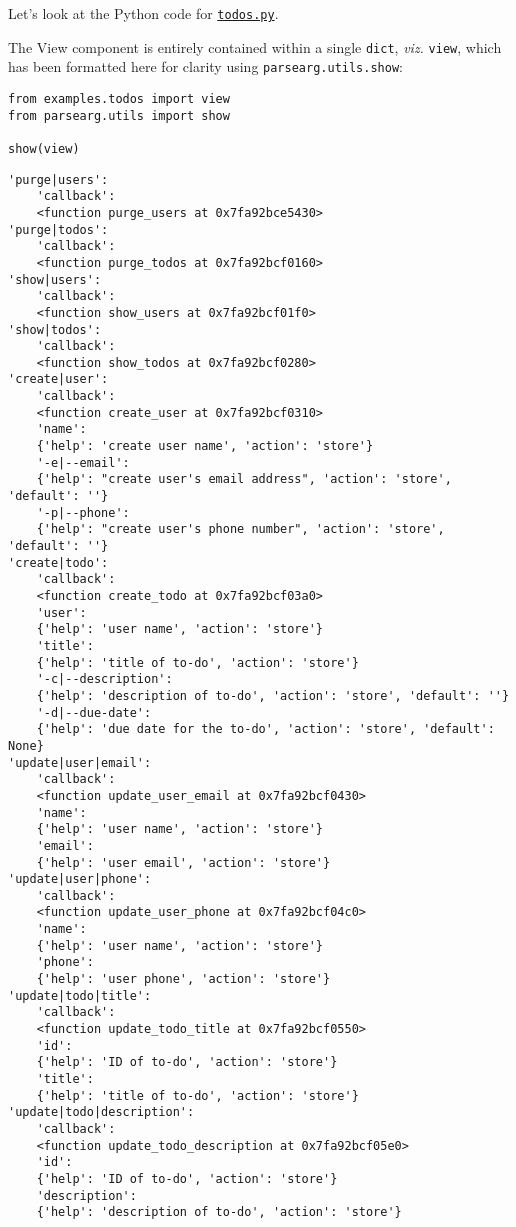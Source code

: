 \documentclass[10pt]{amsart}
\numberwithin{equation}{section}
\begin{document}
Let's look at the Python code 
for \href{https://raw.githubusercontent.com/tharte/parsearg/master/doc/examples/todos.py}{\texttt{todos.py}}.


The View component is entirely contained within a single \texttt{dict}, \emph{viz.} 
\texttt{view}, which has been formatted here for clarity using \texttt{parsearg.utils.show}:
\begin{verbatim}
from examples.todos import view
from parsearg.utils import show

show(view)
\end{verbatim}

\begin{verbatim}
'purge|users':
    'callback':
    <function purge_users at 0x7fa92bce5430>
'purge|todos':
    'callback':
    <function purge_todos at 0x7fa92bcf0160>
'show|users':
    'callback':
    <function show_users at 0x7fa92bcf01f0>
'show|todos':
    'callback':
    <function show_todos at 0x7fa92bcf0280>
'create|user':
    'callback':
    <function create_user at 0x7fa92bcf0310>
    'name':
    {'help': 'create user name', 'action': 'store'}
    '-e|--email':
    {'help': "create user's email address", 'action': 'store', 'default': ''}
    '-p|--phone':
    {'help': "create user's phone number", 'action': 'store', 'default': ''}
'create|todo':
    'callback':
    <function create_todo at 0x7fa92bcf03a0>
    'user':
    {'help': 'user name', 'action': 'store'}
    'title':
    {'help': 'title of to-do', 'action': 'store'}
    '-c|--description':
    {'help': 'description of to-do', 'action': 'store', 'default': ''}
    '-d|--due-date':
    {'help': 'due date for the to-do', 'action': 'store', 'default': None}
'update|user|email':
    'callback':
    <function update_user_email at 0x7fa92bcf0430>
    'name':
    {'help': 'user name', 'action': 'store'}
    'email':
    {'help': 'user email', 'action': 'store'}
'update|user|phone':
    'callback':
    <function update_user_phone at 0x7fa92bcf04c0>
    'name':
    {'help': 'user name', 'action': 'store'}
    'phone':
    {'help': 'user phone', 'action': 'store'}
'update|todo|title':
    'callback':
    <function update_todo_title at 0x7fa92bcf0550>
    'id':
    {'help': 'ID of to-do', 'action': 'store'}
    'title':
    {'help': 'title of to-do', 'action': 'store'}
'update|todo|description':
    'callback':
    <function update_todo_description at 0x7fa92bcf05e0>
    'id':
    {'help': 'ID of to-do', 'action': 'store'}
    'description':
    {'help': 'description of to-do', 'action': 'store'}


\end{verbatim}
\end{document}
